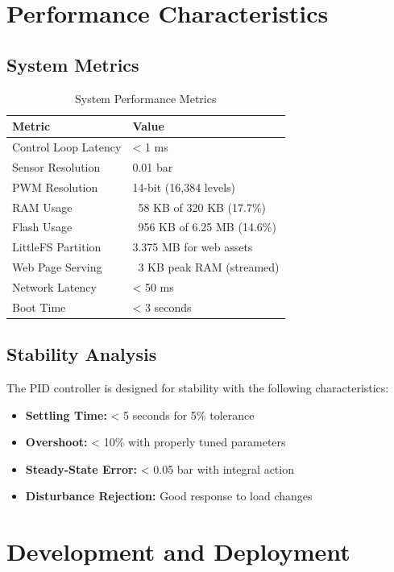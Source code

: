 \documentclass[12pt,a4paper]{article}
\begin{document}
\section{Performance Characteristics}

\subsection{System Metrics}
\begin{table}[H]
\centering
\begin{tabular}{@{}ll@{}}
\toprule
\textbf{Metric} & \textbf{Value} \\
\midrule
Control Loop Latency & < 1 ms \\
Sensor Resolution & 0.01 bar \\
PWM Resolution & 14-bit (16,384 levels) \\
RAM Usage & ~58 KB of 320 KB (17.7\%) \\
Flash Usage & ~956 KB of 6.25 MB (14.6\%) \\
LittleFS Partition & 3.375 MB for web assets \\
Web Page Serving & ~3 KB peak RAM (streamed) \\
Network Latency & < 50 ms \\
Boot Time & < 3 seconds \\
\bottomrule
\end{tabular}
\caption{System Performance Metrics}
\end{table}

\subsection{Stability Analysis}
The PID controller is designed for stability with the following characteristics:
\begin{itemize}
    \item \textbf{Settling Time:} < 5 seconds for 5\% tolerance
    \item \textbf{Overshoot:} < 10\% with properly tuned parameters
    \item \textbf{Steady-State Error:} < 0.05 bar with integral action
    \item \textbf{Disturbance Rejection:} Good response to load changes
\end{itemize}

\section{Development and Deployment}
\end{document}
